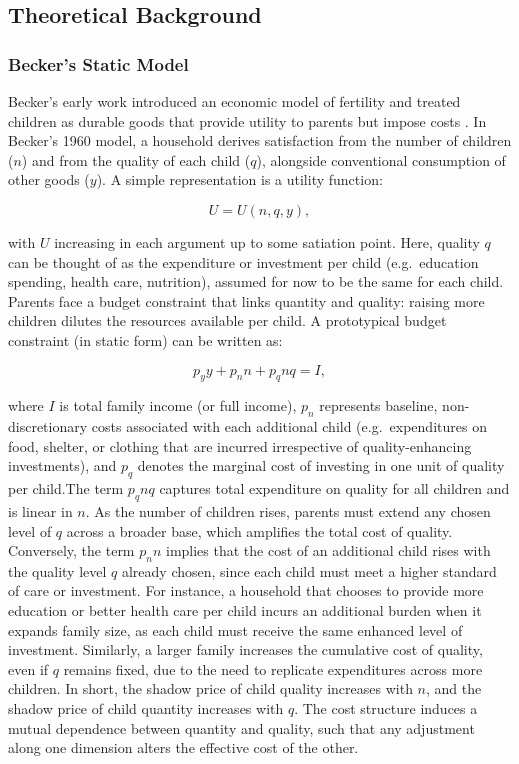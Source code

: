 \documentclass[]{AEA}
\begin{document}
\subsection{Theoretical Background}

\subsubsection{Becker’s Static Model}

Becker's early work introduced an economic model of fertility and
treated children as durable goods that provide utility to parents but
impose costs \citep{doepke2015gary}. In Becker's 1960 model, a household
derives satisfaction from the number of children (\(n\)) and from the
quality of each child (\(q\)), alongside conventional consumption of
other goods (\(y\)). A simple representation is a utility function:

\[
U = U(n, q, y),
\]

with \(U\) increasing in each argument up to some satiation point. Here,
quality \(q\) can be thought of as the expenditure or investment per
child (e.g.~education spending, health care, nutrition), assumed for now
to be the same for each child. Parents face a budget constraint that
links quantity and quality: raising more children dilutes the resources
available per child. A prototypical budget constraint (in static form)
can be written as:

\[
p_y y + p_n n + p_q n q = I,
\]

where \(I\) is total family income (or full income), \(p_n\) represents
baseline, non-discretionary costs associated with each additional child
(e.g.~expenditures on food, shelter, or clothing that are incurred
irrespective of quality-enhancing investments), and \(p_q\) denotes the
marginal cost of investing in one unit of quality per child.The term
\(p_q n q\) captures total expenditure on quality for all children and
is linear in \(n\). As the number of children rises, parents must extend
any chosen level of \(q\) across a broader base, which amplifies the
total cost of quality. Conversely, the term \(p_n n\) implies that the
cost of an additional child rises with the quality level \(q\) already
chosen, since each child must meet a higher standard of care or
investment. For instance, a household that chooses to provide more
education or better health care per child incurs an additional burden
when it expands family size, as each child must receive the same
enhanced level of investment. Similarly, a larger family increases the
cumulative cost of quality, even if \(q\) remains fixed, due to the need
to replicate expenditures across more children. In short, the shadow
price of child quality increases with \(n\), and the shadow price of
child quantity increases with \(q\). The cost structure induces a mutual
dependence between quantity and quality, such that any adjustment along
one dimension alters the effective cost of the other.
\end{document}
